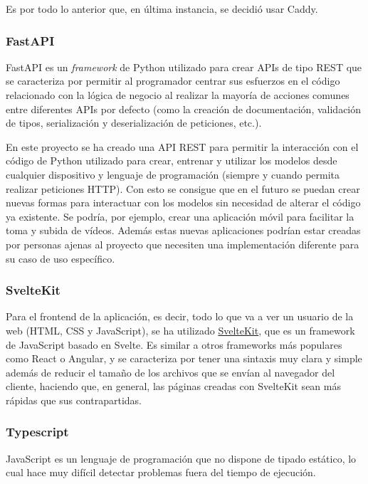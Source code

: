 Es por todo lo anterior que, en última instancia, se decidió usar Caddy.

\subsubsection{FastAPI}

FastAPI es un \textit{framework} de Python utilizado para crear APIs de tipo
REST que se caracteriza por permitir al programador centrar sus esfuerzos en el
código relacionado con la lógica de negocio al realizar la mayoría de acciones
comunes entre diferentes APIs por defecto (como la creación de documentación,
validación de tipos, serialización y deserialización de peticiones, etc.).

En este proyecto se ha creado una API REST para permitir la interacción con el
código de Python utilizado para crear, entrenar y utilizar los modelos desde
cualquier dispositivo y lenguaje de programación (siempre y cuando permita
realizar peticiones HTTP). Con esto se consigue que en el futuro se puedan crear
nuevas formas para interactuar con los modelos sin necesidad de alterar el
código ya existente. Se podría, por ejemplo, crear una aplicación móvil para
facilitar la toma y subida de vídeos. Además estas nuevas aplicaciones podrían
estar creadas por personas ajenas al proyecto que necesiten una implementación
diferente para su caso de uso específico.

\subsubsection{SvelteKit}

Para el frontend de la aplicación, es decir, todo lo que va a ver un usuario de
la web (HTML, CSS y JavaScript), se ha utilizado
\href{https://kit.svelte.dev/}{SvelteKit}, que es un framework de JavaScript
basado en Svelte. Es similar a otros frameworks más populares como React o
Angular, y se caracteriza por tener una sintaxis muy clara y simple además de
reducir el tamaño de los archivos que se envían al navegador del cliente,
haciendo que, en general, las páginas creadas con SvelteKit sean más rápidas que
sus contrapartidas.

\subsubsection{Typescript}

JavaScript es un lenguaje de programación que no dispone de tipado estático, lo
cual hace muy difícil detectar problemas fuera del tiempo de ejecución.

